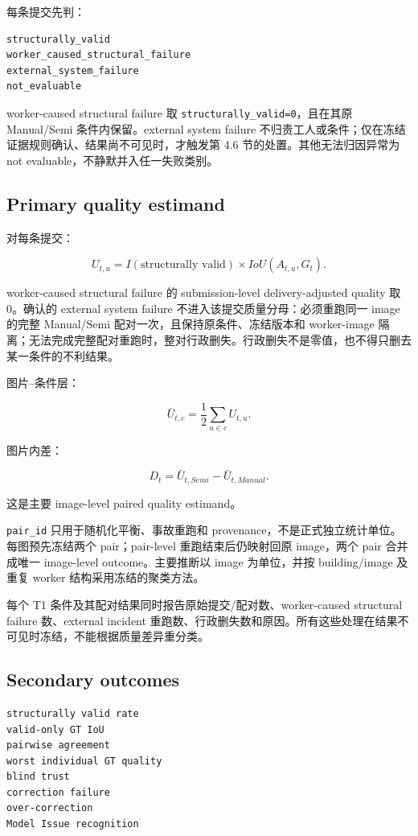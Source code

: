 每条提交先判：

\begin{verbatim}
structurally_valid
worker_caused_structural_failure
external_system_failure
not_evaluable
\end{verbatim}

worker-caused structural failure 取 \texttt{structurally\_valid=0}，且在其原 Manual/Semi 条件内保留。external system failure 不归责工人或条件；仅在冻结证据规则确认、结果尚不可见时，才触发第 4.6 节的处置。其他无法归因异常为 not evaluable，不静默并入任一失败类别。

\subsection{Primary quality estimand}

对每条提交：

\[
U_{t,u}
=
I(\text{structurally valid})\times IoU(A_{t,u},G_t).
\]

worker-caused structural failure 的 submission-level delivery-adjusted quality 取 0。确认的 external system failure 不进入该提交质量分母：必须重跑同一 image 的完整 Manual/Semi 配对一次，且保持原条件、冻结版本和 worker-image 隔离；无法完成完整配对重跑时，整对行政删失。行政删失不是零值，也不得只删去某一条件的不利结果。

图片--条件层：

\[
\bar U_{t,c}
=
\frac{1}{2}\sum_{u\in c}U_{t,u}.
\]

图片内差：

\[
D_t=\bar U_{t,Semi}-\bar U_{t,Manual}.
\]

这是主要 image-level paired quality estimand。

\texttt{pair\_id} 只用于随机化平衡、事故重跑和 provenance，不是正式独立统计单位。
每图预先冻结两个 pair；pair-level 重跑结束后仍映射回原 image，两个 pair 合并成唯一
image-level outcome。主要推断以 image 为单位，并按 building/image 及重复 worker
结构采用冻结的聚类方法。

每个 T1 条件及其配对结果同时报告原始提交/配对数、worker-caused structural failure 数、external incident 重跑数、行政删失数和原因。所有这些处理在结果不可见时冻结，不能根据质量差异重分类。

\subsection{Secondary outcomes}

\begin{verbatim}
structurally valid rate
valid-only GT IoU
pairwise agreement
worst individual GT quality
blind trust
correction failure
over-correction
Model Issue recognition
\end{verbatim}

